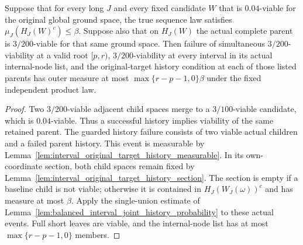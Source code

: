 \begin{lemma}
    \label{lem:actual_interval_original_target_joint_probability}
    \leanok
    Suppose that for every long $J$ and every fixed candidate $W$ that is
    $0.04$-viable for the original global ground space, the true sequence
    law satisfies $\mu_J(H_J(W)^c)\le\beta$. Suppose also that on $H_J(W)$
    the actual complete parent is $3/200$-viable for that same ground
    space. Then failure of simultaneous $3/200$-viability at a valid
    root $[p,r)$, $3/200$-viability at every interval in its actual
    internal-node list, and the original-target history condition at
    each of those listed parents has outer measure at most
    $\max\{r-p-1,0\}\beta$ under the fixed independent product law.
\end{lemma}
\begin{proof}\leanok
    Two $3/200$-viable adjacent child spaces merge to a $3/100$-viable
    candidate, which is $0.04$-viable. Thus a successful history implies
    viability of the same retained parent. The guarded history failure
    consists of two viable actual children and a failed parent history.
    This event is measurable by
    Lemma~\ref{lem:interval_original_target_history_measurable}.
    In its own-coordinate section, both child spaces remain fixed by
    Lemma~\ref{lem:interval_original_target_history_section}. The section
    is empty if a baseline child is not viable; otherwise it is contained
    in $H_J(W_J(\omega))^c$ and has measure at most $\beta$.
    Apply the single-union estimate of
    Lemma~\ref{lem:balanced_interval_joint_history_probability} to these
    actual events. Full short leaves are viable, and the internal-node
    list has at most $\max\{r-p-1,0\}$ members.
\end{proof}


